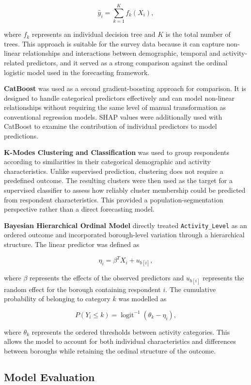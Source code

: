 \documentclass[ %
                    author={Ashrey Ashrey, Sanya Kapoor, Trisha Sharma, Yash Bhooshan Pandloskar},
                supervisor={Dr. Dalila O’Grady},
                    degree={MSc},
                     title={Using machine learning to forecast physical activity participation, volunteering and activity patterns in London},
                  subtitle={},
                      type={},
                      year={2021}]{dissertation}
\begin{document}
\[
\widehat{y}_i = \sum_{k=1}^{K} f_k(X_i),
\]

where \(f_k\) represents an individual decision tree and \(K\) is the total number of trees. This approach is suitable for the survey data because it can capture non-linear relationships and interactions between demographic, temporal and activity-related predictors, and it served as a strong comparison against the ordinal logistic model used in the forecasting framework.

\textbf{CatBoost} was used as a second gradient-boosting approach for comparison. It is designed to handle categorical predictors effectively and can model non-linear relationships without requiring the same level of manual transformation as conventional regression models. SHAP values were additionally used with CatBoost to examine the contribution of individual predictors to model predictions.

\textbf{K-Modes Clustering and Classification} was used to group respondents according to similarities in their categorical demographic and activity characteristics. Unlike supervised prediction, clustering does not require a predefined outcome. The resulting clusters were then used as the target for a supervised classifier to assess how reliably cluster membership could be predicted from respondent characteristics. This provided a population-segmentation perspective rather than a direct forecasting model.

\textbf{Bayesian Hierarchical Ordinal Model} directly treated \texttt{Activity\_Level} as an ordered outcome and incorporated borough-level variation through a hierarchical structure. The linear predictor was defined as

\[
\eta_i = \beta^{T}X_i + u_{b[i]},
\]

where \(\beta\) represents the effects of the observed predictors and \(u_{b[i]}\) represents the random effect for the borough containing respondent \(i\). The cumulative probability of belonging to category \(k\) was modelled as

\[
P(Y_i \leq k) = \operatorname{logit}^{-1}(\theta_k-\eta_i),
\]

where \(\theta_k\) represents the ordered thresholds between activity categories. This allows the model to account for both individual characteristics and differences between boroughs while retaining the ordinal structure of the outcome.

\FloatBarrier
\subsection{Model Evaluation}
\end{document}
